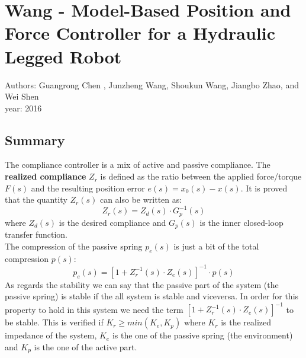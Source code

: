 \section{Wang - Model-Based Position and Force Controller for a Hydraulic Legged Robot \cite{ChenWang}}
Authors: Guangrong Chen , Junzheng Wang, Shoukun Wang, Jiangbo Zhao, and Wei Shen\\
year: 2016
\subsection*{Summary}
The compliance controller is a mix of active and passive compliance. The \textbf{realized compliance} $Z_r$ is defined as the ratio between the applied force/torque $F(s)$ and the resulting position error $e(s) = x_0(s)-x(s)$. It is proved that the quantity $Z_r(s)$ can also be written as:
$$ Z_r(s)  = Z_d(s) \cdot G_p^{-1}(s) $$ where $Z_d(s)$ is the desired compliance and $G_p(s)$ is the inner closed-loop transfer function.\\
The compression of the passive spring $p_e(s)$ is just a bit of the total compression $p(s)$:
$$ p_e(s) = [1+Z_r^{-1}(s) \cdot Z_e(s)]^{-1} \cdot p(s)$$
As regards the stability we can say that the passive part of the system (the passive spring) is stable if the all system is stable and viceversa. In order for this property to hold in this system we need the term $[1+Z_r^{-1}(s) \cdot Z_e(s)]^{-1}$ to be stable. This is verified if $K_r \geq min(K_e, K_p)$ where $K_r$ is the realized impedance of the system, $K_e$ is the one of the passive spring (the environment) and $K_p$ is the one of the active part.
